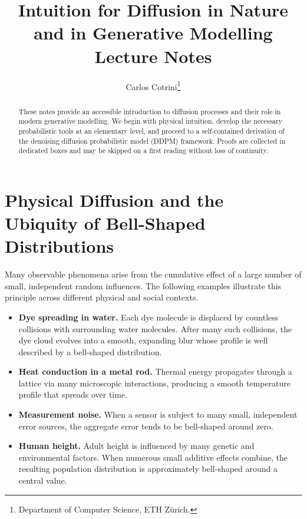 \documentclass[11pt]{article}
\title{\textbf{Intuition for Diffusion in Nature and in Generative Modelling}\\[0.4em]
\large Lecture Notes}
\author{Carlos Cotrini\thanks{Department of Computer Science, ETH Z\"{u}rich.}}
\date{}
\begin{document}
\maketitle

\begin{abstract}
These notes provide an accessible introduction to diffusion processes and their role in modern generative modelling.
We begin with physical intuition, develop the necessary probabilistic tools at an elementary level, and proceed to a self-contained derivation of the denoising diffusion probabilistic model (DDPM) framework.
Proofs are collected in dedicated boxes and may be skipped on a first reading without loss of continuity.
\end{abstract}

\tableofcontents
\bigskip

\section{Physical Diffusion and the Ubiquity of Bell-Shaped Distributions}

Many observable phenomena arise from the cumulative effect of a large number of small, independent random influences.
The following examples illustrate this principle across different physical and social contexts.

\begin{itemize}
  \item \textbf{Dye spreading in water.}
        Each dye molecule is displaced by countless collisions with surrounding water molecules.
        After many such collisions, the dye cloud evolves into a smooth, expanding blur whose profile is well described by a bell-shaped distribution.
  \item \textbf{Heat conduction in a metal rod.}
        Thermal energy propagates through a lattice via many microscopic interactions, producing a smooth temperature profile that spreads over time.
  \item \textbf{Measurement noise.}
        When a sensor is subject to many small, independent error sources, the aggregate error tends to be bell-shaped around zero.
  \item \textbf{Human height.}
        Adult height is influenced by many genetic and environmental factors.
        When numerous small additive effects combine, the resulting population distribution is approximately bell-shaped around a central value.
\end{itemize}
\end{document}
